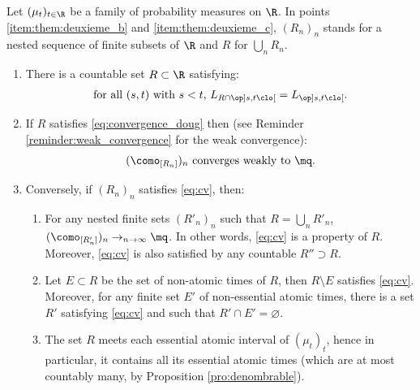 \begin{them}\label{them:deuxieme_sec} Let $(\mu_t)_{t\in \R}$ be a family of probability measures on $\R$. In points \eqref{item:them:deuxieme_b} and \eqref{item:them:deuxieme_c}, $(R_n)_n$ stands for a nested sequence of finite subsets of\/ $\R$ and $R$ for $\bigcup_nR_n$.

\begin{enumerate}
\item
\label{item:them:deuxieme_a} There is a countable set $R\subset\R$ satisfying:
\begin{gather}\label{eq:convergence_doug}
\text{for all $(s,t)$ with $s<t$,}\ L_{R\cap\op]s,t\clo[}=L_{\op]s,t\clo[}.
\end{gather}

\item
\label{item:them:deuxieme_b} If $R$ satisfies \eqref{eq:convergence_doug} then (see Reminder \ref{reminder:weak_convergence} for the weak convergence):
\begin{equation}\label{eq:cv}
\text{$(\como_{[R_n]})_n$ converges weakly to $\mq$.}
\end{equation}

\item
\label{item:them:deuxieme_c} Conversely, if $(R_n)_n$ satisfies \eqref{eq:cv}, then:
\begin{enumerate}
\item\label{item:ordre_facultatif}
For any nested finite sets $(R'_n)_n$ such that $R=\bigcup_nR'_n$, $(\como_{[R'_n]})_n\to_{n\to\infty}\mq$. In other words, \eqref{eq:cv} is a property of $R$. Moreover, \eqref{eq:cv} is also satisfied by any countable $R''\supset R$.
\item\label{item:inatomique_facultatif}
Let $E\subset R$ be the set of non-atomic times of $R$, then $R\setminus E$ satisfies \eqref{eq:cv}. Moreover, for any finite set $E'$ of non-essential atomic times, there is a set $R'$ satisfying \eqref{eq:cv} and such that $R'\cap E'=\varnothing$.
\item\label{item:essentiel_necessaire}
The set $R$ meets each essential atomic interval of $(\mu_t)_t$, hence in particular, it contains all its essential atomic times (which are at most countably many, by Proposition \ref{pro:denombrable}).
\end{enumerate}
\end{enumerate}
\end{them}

